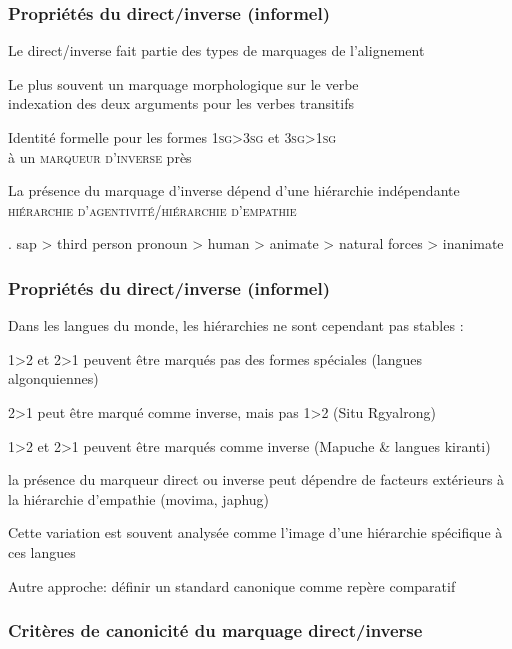 \begin{frame}
\frametitle{Propriétés du direct/inverse (informel)}
\begin{blackwideitemize}
\item Le direct/inverse fait partie des types de marquages de
  l'alignement
\item Le plus souvent un marquage morphologique sur le verbe\\
\ra indexation des deux arguments pour les verbes transitifs
\item Identité formelle pour les formes \textsc{1sg>3sg} et
  \textsc{3sg>1sg}\\ à un \textsc{marqueur d'inverse} près
\item La présence du marquage d'inverse dépend d'une hiérarchie
  indépendante\\
\ra \textsc{hiérarchie d'agentivité/hiérarchie d'empathie} \cite[644]{delancey81}
\end{blackwideitemize}

\ex. {\sc sap} > third person pronoun > human > animate > natural
forces > inanimate\label{ex:delancey}

\end{frame}

\begin{frame}
\frametitle{Propriétés du direct/inverse (informel)}
\begin{blackwideitemize}
\item Dans les langues du monde, les hiérarchies ne sont cependant pas
  stables \cite{jacques13inversecompass}:
\begin{smallwideitemize}
\item \textsc{1>2} et \textsc{2>1} peuvent être marqués pas des formes
  spéciales (langues algonquiennes)
\item \textsc{2>1} peut être marqué comme inverse, mais pas \textsc{1>2} (Situ Rgyalrong)
\item \textsc{1>2} et \textsc{2>1} peuvent être marqués comme inverse
  (Mapuche \& langues kiranti)
\item la présence du marqueur direct ou inverse peut dépendre de
  facteurs extérieurs à la hiérarchie d'empathie (movima, japhug)
\end{smallwideitemize}
\item Cette variation est souvent analysée comme l'image d'une
  hiérarchie spécifique à ces langues
\pause
\item Autre approche: définir un standard canonique comme repère comparatif
\end{blackwideitemize}

\end{frame}

\begin{frame}
\frametitle{Critères de canonicité du marquage direct/inverse}
\end{frame}